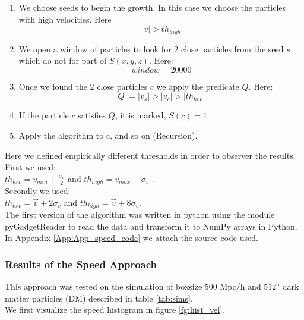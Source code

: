 \documentclass[12pt]{article}
\begin{document}
\begin{enumerate}
	\item We choose seeds to begin the growth. In
	 this case we choose the particles with high
	  velocities. Here \[ |v|>  th_{high}\]
	\item We open a window of particles to look
	 for 2 close particles from the seed $s$ which
	  do not for part of $S(x,y,z)$. Here:
    \[ window = 20000\]
    \item Once we found the 2 close particles $c$ we apply the predicate $Q$. Here:
    \[ Q := |v_s| > |v_c| > |th_{low}|\]
    
    \item If the particle $c$ satisfies $Q$, it is
     marked, $S(c) = 1$
    \item Apply the algorithm to $c$, and so on
     (Recursion).
\end{enumerate}

Here we defined empirically different thresholds
 in order to observer the results. \\
First we used:  \\
$th_{low} = v_{min} + \frac{\sigma_{v}}{2} $ and
 $th_{high} = v_{max}  - \sigma_{v}$ .\\
Secondly we used: \\
$th_{low} = \vec{v} + 2  \sigma_{v} $ and $th_{high} = \vec{v}  +  8 \sigma_{v}$.\\

The first version of the algorithm was written in
 python using the module
pyGadgetReader
 \cite{thompson_pygadgetreader_2014ascl_soft11001T}
  to read the
data and transform it to NumPy arrays in Python.
 In Appendix \ref{App:App_speed_code} we attach
  the source code used.

\subsubsection{Results of the Speed Approach}
This approach was tested on the simulation of
 boxsize 500 Mpc/h
and $512^{3}$ dark matter particles (DM) described
 in table \ref{tab:sims}. \\

We first visualize the speed histogram in figure
 \ref{fg:hist_vel}.\\
\end{document}
